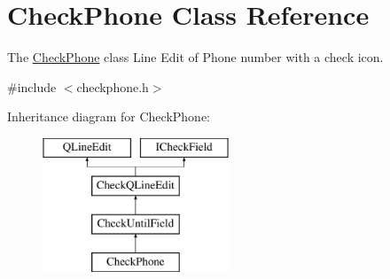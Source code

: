 \hypertarget{classCheckPhone}{\section{Check\-Phone Class Reference}
\label{classCheckPhone}
}


The \hyperlink{classCheckPhone}{Check\-Phone} class Line Edit of Phone number with a check icon.  




{\ttfamily \#include $<$checkphone.\-h$>$}

Inheritance diagram for Check\-Phone\-:\begin{figure}[H]
\begin{center}
\leavevmode
\includegraphics[height=4.000000cm]{d0/ddb/classCheckPhone}
\end{center}
\end{figure}
